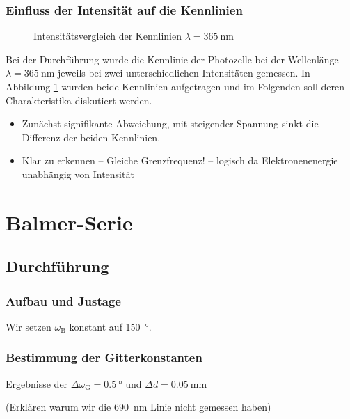 \documentclass[11pt, a4paper]{article}
\numberwithin{equation}{section}
\begin{document}
\subsubsection{Einfluss der Intensität auf die Kennlinien}
\begin{figure}[h]
	\centering
	
	\caption{Intensitätsvergleich der Kennlinien $\lambda = \SI{365}{\nano\metre}$}
	\label{fig:kennlinie_intensitaet}
\end{figure}
Bei der Durchführung wurde die Kennlinie der Photozelle bei der Wellenlänge $\lambda = \SI{365}{\nano\metre}$ jeweils bei zwei unterschiedlichen Intensitäten gemessen.
In Abbildung \ref{fig:kennlinie_intensitaet} wurden beide Kennlinien aufgetragen und im Folgenden soll deren Charakteristika diskutiert werden.
\begin{itemize}
	\item Zunächst signifikante Abweichung, mit steigender Spannung sinkt die Differenz der beiden Kennlinien.
	\item Klar zu erkennen -- Gleiche Grenzfrequenz! -- logisch da Elektronenenergie unabhängig von Intensität
\end{itemize}


\section{Balmer-Serie}

\subsection{Durchführung}

\subsubsection{Aufbau und Justage}
Wir setzen $\omega_\mathrm{B}$ konstant auf \SI{150}{\degree}.

\subsubsection{Bestimmung der Gitterkonstanten}
\begin{table}[h]
	\centering
	
	\caption{Ergebnisse der $\Delta \omega_\mathrm{G} = \SI{0.5}{\degree}$ und $\Delta d = \SI{0.05}{\milli\metre}$}
	\label{tab:gitterkonstante_messdaten}
\end{table}
(Erklären warum wir die \SI{690}{\nano\metre} Linie nicht gemessen haben)
\end{document}
